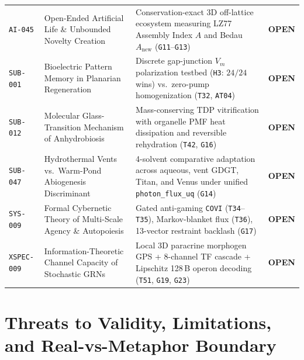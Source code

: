 \documentclass[11pt,reqno]{amsart}
\theoremstyle{plain}
\theoremstyle{definition}
\theoremstyle{remark}
\newcommand{\tcode}[1]{{\scriptsize\nolinkurl{#1}}}
\begin{document}
\begin{table}[ht]
\begin{tabularx}{\textwidth}{@{} P{1.65cm} P{3.95cm} Y P{1.15cm} @{}}
\tcode{AI-045} & Open-Ended Artificial Life \& Unbounded Novelty Creation & Conservation-exact 3D off-lattice ecosystem measuring LZ77 Assembly Index $A$ and Bedau $A_{\mathrm{new}}$ (\tcode{G11}--\tcode{G13}) & \textbf{OPEN} \\
\tcode{SUB-001} & Bioelectric Pattern Memory in Planarian Regeneration & Discrete gap-junction $V_m$ polarization testbed (\tcode{H3}: $24/24$ wins) vs.\ zero-pump homogenization (\tcode{T32}, \tcode{AT04}) & \textbf{OPEN} \\
\tcode{SUB-012} & Molecular Glass-Transition Mechanism of Anhydrobiosis & Mass-conserving TDP vitrification with organelle PMF heat dissipation and reversible rehydration (\tcode{T42}, \tcode{G16}) & \textbf{OPEN} \\
\tcode{SUB-047} & Hydrothermal Vents vs.\ Warm-Pond Abiogenesis Discriminant & 4-solvent comparative adaptation across aqueous, vent GDGT, Titan, and Venus under unified \tcode{photon_flux_uq} (\tcode{G14}) & \textbf{OPEN} \\
\tcode{SYS-009} & Formal Cybernetic Theory of Multi-Scale Agency \& Autopoiesis & Gated anti-gaming \tcode{COVI} (\tcode{T34}--\tcode{T35}), Markov-blanket flux (\tcode{T36}), 13-vector restraint backlash (\tcode{G17}) & \textbf{OPEN} \\
\tcode{XSPEC-009} & Information-Theoretic Channel Capacity of Stochastic GRNs & Local 3D paracrine morphogen GPS + 8-channel TF cascade + Lipschitz 128\,B operon decoding (\tcode{T51}, \tcode{G19}, \tcode{G23}) & \textbf{OPEN} \\
\bottomrule
\end{tabularx}
\end{table}

\section{Threats to Validity, Limitations, and Real-vs-Metaphor Boundary}
\label{sec:limitations}
\end{document}
